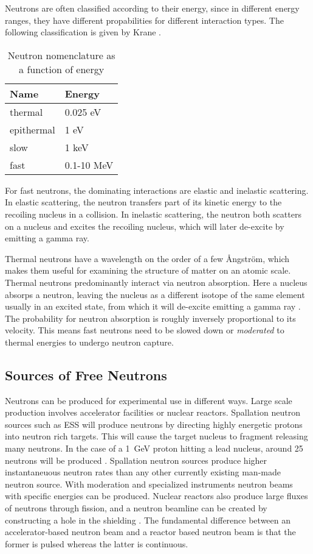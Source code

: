 \documentclass[main.tex]{subfiles}
\begin{document}
Neutrons are often classified according to their energy, since in different energy ranges, they have different propabilities for different interaction types. The following classification is given by Krane \cite{Krane}.

\begin{table}[h]
\center
\begin{tabular}{|l|l|}
\hline
\textbf{Name} & \textbf{Energy} \\ \hline
thermal       & 0.025 eV        \\ \hline
epithermal    & 1 eV            \\ \hline
slow          & 1 keV           \\ \hline
fast          & 0.1-10 MeV      \\ \hline
\end{tabular}
\caption[Neutron nomenclature as a function of energy]{Neutron nomenclature as a function of energy}
\label{tab:neutron}
\end{table}

For fast neutrons, the dominating interactions are elastic and inelastic scattering. In elastic scattering, the neutron transfers part of its kinetic energy to the recoiling nucleus in a collision. In inelastic scattering, the neutron both scatters on a nucleus and excites the recoiling nucleus, which will later de-excite by emitting a gamma ray. 

Thermal neutrons have a wavelength on the order of a few Ångström, which makes them useful for examining the structure of matter on an atomic scale. Thermal neutrons predominantly interact via neutron absorption. Here a nucleus absorps a neutron, leaving the nucleus as a different isotope of the same element usually in an excited state, from which it will de-excite emitting a gamma ray \cite{Leo}. The probability for neutron absorption is roughly inversely proportional to its velocity. This means fast neutrons need to be slowed down or \textit{moderated} to thermal energies to undergo neutron capture. 

\subsection{Sources of Free Neutrons}
Neutrons can be produced for experimental use in different ways. Large scale production involves accelerator facilities or nuclear reactors. Spallation neutron sources such as ESS will produce neutrons by directing highly energetic protons into neutron rich targets. This will cause the target nucleus to fragment releasing many neutrons. In the case of a \SI{1}{\GeV} proton hitting a lead nucleus, around 25 neutrons will be produced \cite{Tavernier}. Spallation neutron sources produce higher instantaneuous neutron rates than any other currently existing man-made neutron source. With moderation and specialized instruments neutron beams with specific energies can be produced. Nuclear reactors also produce large fluxes of neutrons through fission, and a neutron beamline can be created by constructing a hole in the shielding  \cite{Krane}. The fundamental difference between an accelerator-based neutron beam and a reactor based neutron beam is that the former is pulsed whereas the latter is continuous.
\end{document}
